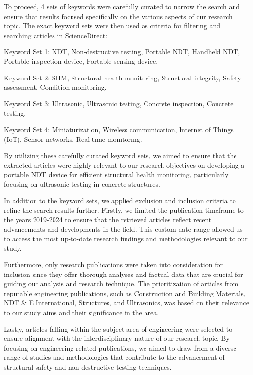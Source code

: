 \documentclass[journal, a4paper]{IEEEtran}
\begin{document}
To proceed, 4 sets of keywords were carefully curated to narrow the search and ensure that results focused specifically on the various aspects of our research topic. The exact keyword sets were then used as criteria for filtering and searching articles in ScienceDirect:

    Keyword Set 1: NDT, Non-destructive testing, Portable NDT, Handheld NDT, Portable inspection device, Portable sensing device.

    Keyword Set 2: SHM, Structural health monitoring, Structural integrity, Safety assessment, Condition monitoring.

    Keyword Set 3: Ultrasonic, Ultrasonic testing, Concrete inspection, Concrete testing.

    Keyword Set 4: Miniaturization, Wireless communication, Internet of Things (IoT), Sensor networks, Real-time monitoring.

By utilizing these carefully curated keyword sets, we aimed to ensure that the extracted articles were highly relevant to our research objectives on developing a portable NDT device for efficient structural health monitoring, particularly focusing on ultrasonic testing in concrete structures. 

In addition to the keyword sets, we applied exclusion and inclusion criteria to refine the search results further. Firstly, we limited the publication timeframe to the years 2019-2024 to ensure that the retrieved articles reflect recent advancements and developments in the field. This custom date range allowed us to access the most up-to-date research findings and methodologies relevant to our study.

Furthermore, only research publications were taken into consideration for inclusion since they offer thorough analyses and factual data that are crucial for guiding our analysis and research technique. The prioritization of articles from reputable engineering publications, such as Construction and Building Materials, NDT \& E International, Structures, and Ultrasonics, was based on their relevance to our study aims and their significance in the area.

Lastly, articles falling within the subject area of engineering were selected to ensure alignment with the interdisciplinary nature of our research topic. By focusing on engineering-related publications, we aimed to draw from a diverse range of studies and methodologies that contribute to the advancement of structural safety and non-destructive testing techniques.
\end{document}
